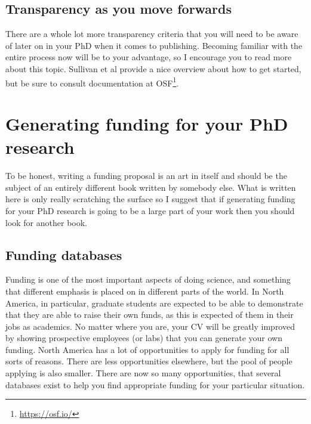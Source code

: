 \documentclass[
]{krantz}
\renewcommand{\href}[2]{#2\footnote{\url{#1}}}
\begin{document}
\hypertarget{transparency-as-you-move-forwards}{%
\subsection{Transparency as you move forwards}\label{transparency-as-you-move-forwards}}

There are a whole lot more transparency criteria that you will need to be aware of later on in your PhD when it comes to publishing. Becoming familiar with the entire process now will be to your advantage, so I encourage you to read more about this topic. Sullivan et al \citeyearpar{sullivan2019open} provide a nice overview about how to get started, but be sure to consult documentation at \href{https://osf.io/}{OSF}.

\hypertarget{funding}{%
\section{Generating funding for your PhD research}\label{funding}}

To be honest, writing a funding proposal is an art in itself and should be the subject of an entirely different book written by somebody else. What is written here is only really scratching the surface so I suggest that if generating funding for your PhD research is going to be a large part of your work then you should look for another book.

\hypertarget{funding-databases}{%
\subsection{Funding databases}\label{funding-databases}}

Funding is one of the most important aspects of doing science, and something that different emphasis is placed on in different parts of the world. In North America, in particular, graduate students are expected to be able to demonstrate that they are able to raise their own funds, as this is expected of them in their jobs as academics. No matter where you are, your CV will be greatly improved by showing prospective employees (or labs) that you can generate your own funding. North America has a lot of opportunities to apply for funding for all sorts of reasons. There are less opportunities elsewhere, but the pool of people applying is also smaller. There are now so many opportunities, that several databases exist to help you find appropriate funding for your particular situation.
\end{document}
